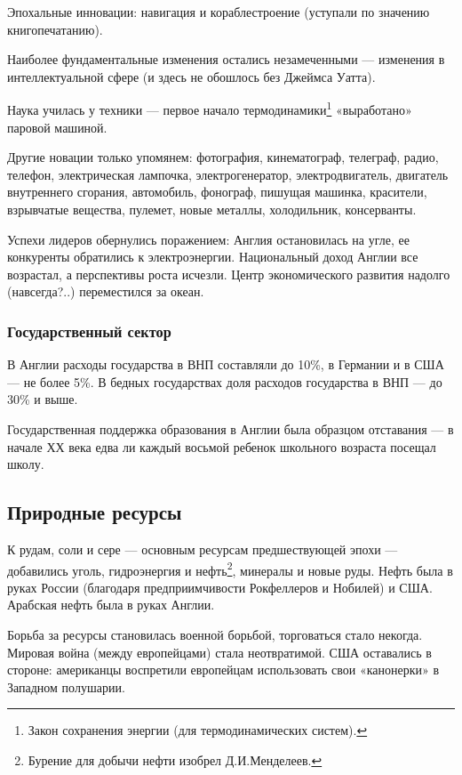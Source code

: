 Эпохальные инновации: навигация и кораблестроение (уступали по значению книгопечатанию).


Наиболее фундаментальные изменения остались незамеченными — изменения в интеллектуальной сфере (и здесь не обошлось без
Джеймса Уатта).


Наука училась у техники — первое начало термодинамики\footnote{Закон сохранения энергии (для
термодинамических систем).} «выработано» паровой машиной.


Другие новации только упомянем: фотография, кинематограф, телеграф, радио, телефон, электрическая лампочка,
электрогенератор, электродвигатель, двигатель внутреннего сгорания, автомобиль, фонограф, пишущая машинка, красители,
взрывчатые вещества, пулемет, новые металлы, холодильник, консерванты.


Успехи лидеров обернулись поражением: Англия остановилась на угле, ее конкуренты обратились к электроэнергии.
Национальный доход Англии все возрастал, а перспективы роста исчезли. Центр экономического развития надолго
(навсегда?..) переместился за океан.

\subsubsection[Государственный сектор]{Государственный сектор}

В Англии расходы государства в ВНП составляли до 10\%, в Германии и в США — не более 5\%. В бедных государствах доля
расходов государства в ВНП — до 30\% и выше.


Государственная поддержка образования в Англии была образцом отставания — в начале ХХ века едва ли каждый восьмой
ребенок школьного возраста посещал школу.

\subsection[Природные ресурсы]{Природные ресурсы}

К рудам, соли и сере — основным ресурсам предшествующей эпохи — добавились уголь, гидроэнергия и
нефть\footnote{Бурение для добычи нефти изобрел Д.И.Менделеев.}, минералы и новые руды. Нефть была в
руках России (благодаря предприимчивости Рокфеллеров и Нобилей) и США. Арабская нефть была в руках Англии.


Борьба за ресурсы становилась военной борьбой, торговаться стало некогда. Мировая война (между европейцами) стала
неотвратимой. США оставались в стороне: американцы воспретили европейцам использовать свои «канонерки» в Западном
полушарии.


